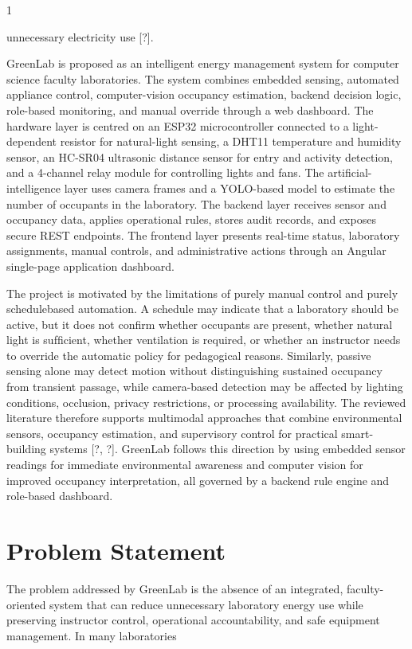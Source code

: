 1


unnecessary electricity use [?].

GreenLab is proposed as an intelligent energy management system for computer science faculty laboratories. The system combines embedded sensing, automated appliance
control, computer-vision occupancy estimation, backend decision logic, role-based monitoring, and manual override through a web dashboard. The hardware layer is centred on an
ESP32 microcontroller connected to a light-dependent resistor for natural-light sensing, a
DHT11 temperature and humidity sensor, an HC-SR04 ultrasonic distance sensor for entry
and activity detection, and a 4-channel relay module for controlling lights and fans. The
artiﬁcial-intelligence layer uses camera frames and a YOLO-based model to estimate the
number of occupants in the laboratory. The backend layer receives sensor and occupancy
data, applies operational rules, stores audit records, and exposes secure REST endpoints.
The frontend layer presents real-time status, laboratory assignments, manual controls, and
administrative actions through an Angular single-page application dashboard.

The project is motivated by the limitations of purely manual control and purely schedulebased automation. A schedule may indicate that a laboratory should be active, but it does
not conﬁrm whether occupants are present, whether natural light is sufﬁcient, whether ventilation is required, or whether an instructor needs to override the automatic policy for pedagogical reasons. Similarly, passive sensing alone may detect motion without distinguishing
sustained occupancy from transient passage, while camera-based detection may be affected
by lighting conditions, occlusion, privacy restrictions, or processing availability. The reviewed literature therefore supports multimodal approaches that combine environmental
sensors, occupancy estimation, and supervisory control for practical smart-building systems
[?, ?]. GreenLab follows this direction by using embedded sensor readings for immediate
environmental awareness and computer vision for improved occupancy interpretation, all
governed by a backend rule engine and role-based dashboard.




\section{Problem Statement}


The problem addressed by GreenLab is the absence of an integrated, faculty-oriented system that can reduce unnecessary laboratory energy use while preserving instructor control, operational accountability, and safe equipment management. In many laboratories

